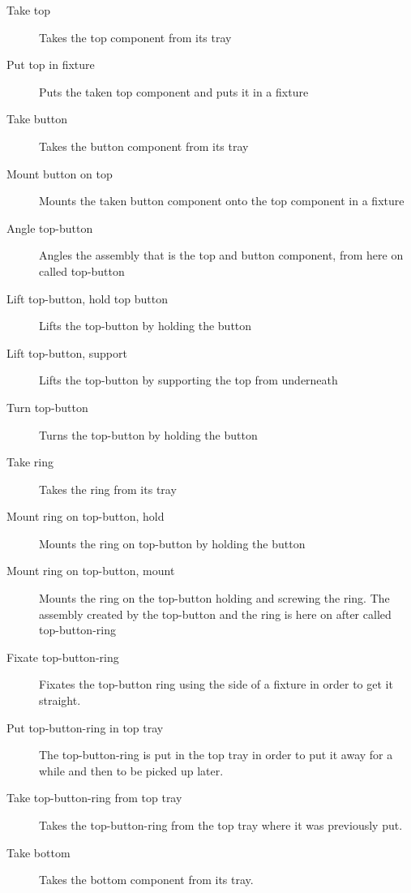 \begin{description}
\item[Take top] Takes the top component from its tray

\item[Put top in fixture] Puts the taken top component and puts it in a fixture

\item[Take button] Takes the button component from its tray

\item[Mount button on top] Mounts the taken button component onto the top component in a fixture

\item[Angle top-button] Angles the assembly that is the top and button component, from here on called top-button

\item[Lift top-button, hold top button] Lifts the top-button by holding the button

\item[Lift top-button, support] Lifts the top-button by supporting the top from underneath

\item[Turn top-button] Turns the top-button by holding the button

\item[Take ring] Takes the ring from its tray

\item[Mount ring on top-button, hold] Mounts the ring on top-button by holding the button

\item[Mount ring on top-button, mount] Mounts the ring on the top-button holding and screwing the ring. The assembly created by the top-button and the ring is here on after called top-button-ring

\item[Fixate top-button-ring] Fixates the top-button ring using the side of a fixture in order to get it straight.

\item[Put top-button-ring in top tray] The top-button-ring is put in the top tray in order to put it away for a while and then to be picked up later.

\item[Take top-button-ring from top tray] Takes the top-button-ring from the top tray where it was previously put.

\item[Take bottom] Takes the bottom component from its tray.


\end{description}
